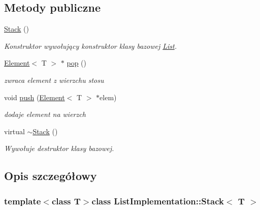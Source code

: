 \subsection*{Metody publiczne}
\begin{DoxyCompactItemize}
\item 
\hypertarget{class_list_implementation_1_1_stack_adb5bbd213fc32837a8bccfe76dd40d64}{\hyperlink{class_list_implementation_1_1_stack_adb5bbd213fc32837a8bccfe76dd40d64}{Stack} ()}\label{class_list_implementation_1_1_stack_adb5bbd213fc32837a8bccfe76dd40d64}

\begin{DoxyCompactList}\small\item\em Konstruktor wywołujący konstruktor klasy bazowej \hyperlink{class_list_implementation_1_1_list}{List}. \end{DoxyCompactList}\item 
\hyperlink{class_element}{Element}$<$ T $>$ $\ast$ \hyperlink{class_list_implementation_1_1_stack_abdb24c8782d108c5860d7cdf6684edcb}{pop} ()
\begin{DoxyCompactList}\small\item\em zwraca element z wierzchu stosu \end{DoxyCompactList}\item 
void \hyperlink{class_list_implementation_1_1_stack_a68d1136b2a159ebb9a0f3f8b6556f404}{push} (\hyperlink{class_element}{Element}$<$ T $>$ $\ast$elem)
\begin{DoxyCompactList}\small\item\em dodaje element na wierzch \end{DoxyCompactList}\item 
\hypertarget{class_list_implementation_1_1_stack_a42841378ab51ccfd0e666db83daa5365}{virtual \hyperlink{class_list_implementation_1_1_stack_a42841378ab51ccfd0e666db83daa5365}{$\sim$\-Stack} ()}\label{class_list_implementation_1_1_stack_a42841378ab51ccfd0e666db83daa5365}

\begin{DoxyCompactList}\small\item\em Wywołuje destruktor klasy bazowej. \end{DoxyCompactList}\end{DoxyCompactItemize}


\subsection{Opis szczegółowy}
\subsubsection*{template$<$class T$>$class List\-Implementation\-::\-Stack$<$ T $>$}

